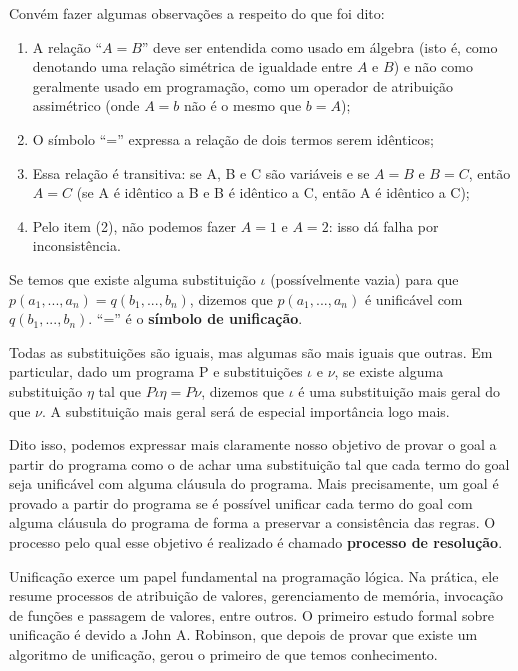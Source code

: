 \documentclass{article}
\theoremstyle{remark}
\theoremstyle{theorem}
\begin{document}
Convém fazer algumas observações a respeito do que foi dito:

\begin{enumerate}
  \item A relação ``$A = B$'' deve ser entendida como usado em álgebra (isto é, como denotando uma relação simétrica de igualdade entre $A$ e $B$) e não como geralmente usado em programação, como um operador de atribuição assimétrico (onde $A = b$ não é o mesmo que $b = A$);
  \item O símbolo ``='' expressa a relação de dois termos serem idênticos;
  \item Essa relação é transitiva: se A, B e C são variáveis e se $A = B$ e $B = C$, então $A = C$ (se A é idêntico a B e B é idêntico a C, então A é idêntico a C);
  \item Pelo item (2), não podemos fazer $A = 1$ e $A = 2$: isso dá falha por inconsistência.
\end{enumerate}

Se temos que existe alguma substituição $\iota$ (possívelmente vazia) para que $p(a_1, ..., a_n) = q(b_1, ..., b_n)$, dizemos que  $p(a_1, ..., a_n)$ é unificável com $q(b_1, ..., b_n)$. ``='' é o \textbf{símbolo de unificação}.

Todas as substituições são iguais, mas algumas são mais iguais que outras. Em particular, dado um programa P e substituições $\iota$ e $\nu$, se existe alguma substituição $\eta$ tal que $P\iota\eta = P \nu$, dizemos que $\iota$ é uma substituição mais geral do que $\nu$. A substituição mais geral será de especial importância logo mais. %

Dito isso, podemos expressar mais claramente nosso objetivo de provar o goal a partir do programa como o de achar uma substituição tal que cada termo do goal seja unificável com alguma cláusula do programa. Mais precisamente, um goal é provado a partir do programa se é possível unificar cada termo do goal com alguma cláusula do programa de forma a preservar a consistência das regras. O processo pelo qual esse objetivo é realizado é chamado \textbf{processo de resolução}.

Unificação exerce um papel fundamental na programação lógica. Na prática, ele resume processos de atribuição de valores, gerenciamento de memória, invocação de funções e passagem de valores, entre outros. O primeiro estudo formal sobre unificação é devido a John A. Robinson, que depois de provar que existe um algoritmo de unificação, gerou o primeiro de que temos conhecimento. %
\end{document}

